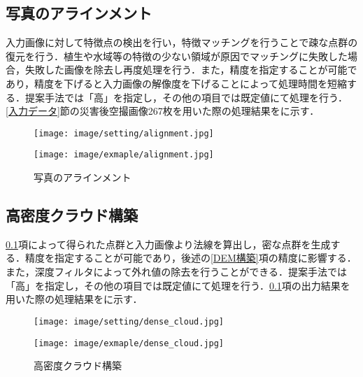     \subsection{写真のアラインメント}
      \label{写真のアラインメント}
      入力画像に対して特徴点の検出を行い，特徴マッチングを行うことで疎な点群の復元を行う．植生や水域等の特徴の少ない領域が原因でマッチングに失敗した場合，失敗した画像を除去し再度処理を行う．また，精度を指定することが可能であり，精度を下げると入力画像の解像度を下げることによって処理時間を短縮する．提案手法では「高」を指定し，その他の項目では既定値にて処理を行う．\ref{入力データ}節の災害後空撮画像267枚を用いた際の処理結果をに示す．

      \begin{figure}[tbp]
        \begin{minipage}[c]{0.45\hsize}
          \centering
          \texttt{[image: image/setting/alignment.jpg]}
        \end{minipage}
        \begin{minipage}[c]{0.45\hsize}
          \centering
          \texttt{[image: image/exmaple/alignment.jpg]}
        \end{minipage}
        \caption{写真のアラインメント}
        \label{写真のアラインメント結果}
      \end{figure}


    \subsection{高密度クラウド構築}
      \label{高密度クラウド構築}
      \ref{写真のアラインメント}項によって得られた点群と入力画像より法線を算出し，密な点群を生成する．精度を指定することが可能であり，後述の\ref{DEM構築}項の精度に影響する．また，深度フィルタによって外れ値の除去を行うことができる．提案手法では「高」を指定し，その他の項目では既定値にて処理を行う．\ref{写真のアラインメント}項の出力結果を用いた際の処理結果をに示す．

      \begin{figure}[tbp]
        \begin{minipage}[c]{0.45\hsize}
          \centering
          \texttt{[image: image/setting/dense\_cloud.jpg]}
          \label{高密度クラウド構築設定値}
        \end{minipage}
        \begin{minipage}[c]{0.45\hsize}
          \centering
          \texttt{[image: image/exmaple/dense\_cloud.jpg]}
        \end{minipage}
        \caption{高密度クラウド構築}
        \label{高密度クラウド構築結果}
      \end{figure}


